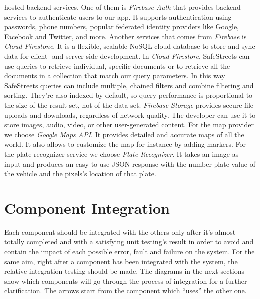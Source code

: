 \documentclass[../RASD.tex]{subfiles}
\begin{document}
\begin{itemize}
        hosted backend services.
        One of them is \textit{Firebase Auth} that provides backend services to authenticate users to our app.
        It supports authentication using passwords, phone numbers, popular federated identity providers like Google, Facebook and Twitter, and more.
        Another services that comes from \textit{Firebase} is \textit{Cloud Firestone}.
        It is a flexible, scalable NoSQL cloud database to store and sync data for client- and server-side development.
        In \textit{Cloud Firestore}, SafeStreets can use queries to retrieve individual, specific documents or to retrieve all the documents
        in a collection that match our query parameters.
        In this way SafeStreets queries can include multiple, chained filters and combine filtering and sorting.
        They're also indexed by default, so query performance is proportional to the size of the result set, not of the data set.
        \textit{Firebase Storage} provides secure file uploads and downloads, regardless of network quality.
        The developer can use it to store images, audio, video, or other user-generated content.
        For the map provider we choose \textit{Google Maps API}.
        It provides detailed and accurate maps of all the world.
        It also allows to customize the map for instance by adding markers.
        For the plate recognizer service we choose \textit{Plate Recognizer}.
        It takes an image as input and produces an easy to use JSON response with the number plate value of the vehicle and the pixels's location of that plate.
    \end{itemize}
    \newpage
    \section{Component Integration}\label{sec:component-integration}
    Each component should be integrated with the others only after it’s almost totally completed and with a satisfying unit testing’s result in order
    to avoid and contain the impact of each possible error, fault and failure on the system.
    For the same aim, right after a component has been integrated with the system, the relative integration testing should be made.
    The diagrams in the next sections show which components will go through the process of integration for a further clarification.
    The arrows start from the component which “uses” the other one.
\end{document}
